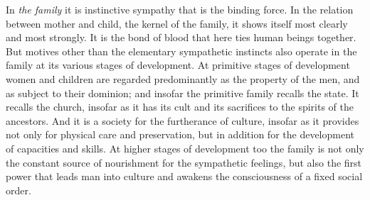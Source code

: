 \documentclass[12pt,a4paper,openany]{book}
\newcommand{\opage}[1]{\marginnote{\footnotesize\textit{[#1]}}}
\begin{document}
In \textit{the family} it is instinctive sympathy that is the binding force. In the relation between mother and child,
the kernel of the family, it shows itself most clearly and most strongly. It is the bond of blood that here ties human
beings together. But motives other than the elementary sympathetic instincts also operate in the family at its various
stages of development. At primitive stages of development women and children are regarded predominantly as the property
of the men,
\opage{275}and as subject to their dominion; and insofar the primitive family recalls the state. It recalls the
church, insofar as it has its cult and its sacrifices to the spirits of the ancestors. And it is a society for the
furtherance of culture, insofar as it provides not only for physical care and preservation, but in addition for the
development of capacities and skills. At higher stages of development too the family is not only the constant source of
nourishment for the sympathetic feelings, but also the first power that leads man into culture and awakens the
consciousness of a fixed social order.
\end{document}
